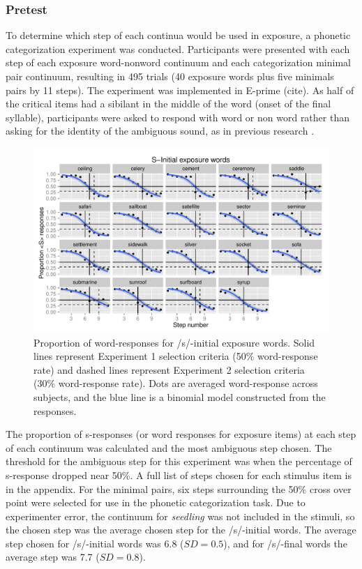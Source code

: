 \subsubsection{Pretest}

To determine which step of each continua would be used in exposure, a phonetic categorization experiment was conducted.  Participants were presented with each step of each exposure word-nonword continuum and each categorization minimal pair continuum, resulting in 495 trials (40 exposure words plus five minimals pairs by 11 steps).  The experiment was implemented in E-prime (cite).  As half of the critical items had a sibilant in the middle of the word (onset of the final syllable), participants were asked to respond with word or non word rather than asking for the identity of the ambiguous sound, as in previous research \citep{Reinisch2013}.  

\begin{figure}
\includegraphics[width=\textwidth]{sinitialpretest.pdf}
\caption{Proportion of word-responses for /s/-initial exposure words. Solid lines represent Experiment 1 selection criteria (50\% word-response rate) and dashed lines represent Experiment 2 selection criteria (30\% word-response rate).  Dots are averaged word-response across subjects, and the blue line is a binomial model constructed from the responses.}
\end{figure}

The proportion of s-responses (or word responses for exposure items) at each step of each continuum was calculated and the most ambiguous step chosen.  The threshold for the ambiguous step for this experiment was when the percentage of s-response dropped near 50\%. A full list of steps chosen for each stimulus item is in the appendix.  For the minimal pairs, six steps surrounding the 50\% cross over point were selected for use in the phonetic categorization task.  Due to experimenter error, the continuum for \emph{seedling} was not included in the stimuli, so the chosen step was the average chosen step for the /s/-initial words.  The average step chosen for /s/-initial words was 6.8 ($SD = 0.5$), and for /s/-final words the average step was 7.7 ($SD = 0.8$).


